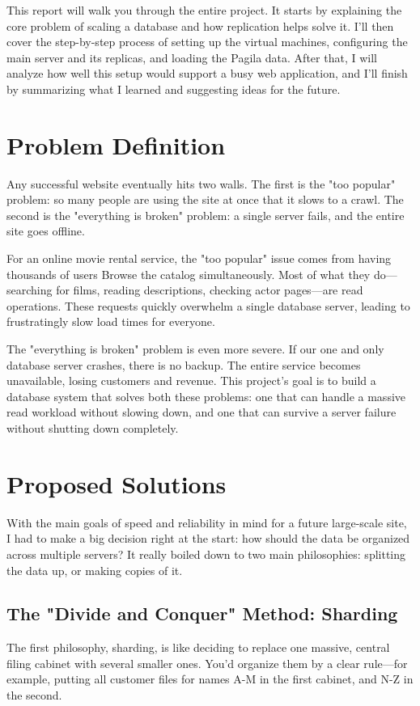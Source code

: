 \documentclass[conference]{IEEEtran}
\begin{document}
This report will walk you through the entire project. It starts by explaining the core problem of scaling a database and how replication helps solve it. I'll then cover the step-by-step process of setting up the virtual machines, configuring the main server and its replicas, and loading the Pagila data. After that, I will analyze how well this setup would support a busy web application, and I'll finish by summarizing what I learned and suggesting ideas for the future.
\section{Problem Definition}
Any successful website eventually hits two walls. The first is the "too popular" problem: so many people are using the site at once that it slows to a crawl. The second is the "everything is broken" problem: a single server fails, and the entire site goes offline.

For an online movie rental service, the "too popular" issue comes from having thousands of users Browse the catalog simultaneously. Most of what they do—searching for films, reading descriptions, checking actor pages—are read operations. These requests quickly overwhelm a single database server, leading to frustratingly slow load times for everyone.

The "everything is broken" problem is even more severe. If our one and only database server crashes, there is no backup. The entire service becomes unavailable, losing customers and revenue. This project's goal is to build a database system that solves both these problems: one that can handle a massive read workload without slowing down, and one that can survive a server failure without shutting down completely.

\section{Proposed Solutions}

With the main goals of speed and reliability in mind for a future large-scale site, I had to make a big decision right at the start: how should the data be organized across multiple servers? It really boiled down to two main philosophies: splitting the data up, or making copies of it.


\subsection{The "Divide and Conquer" Method: Sharding}
The first philosophy, sharding, is like deciding to replace one massive, central filing cabinet with several smaller ones. You'd organize them by a clear rule—for example, putting all customer files for names A-M in the first cabinet, and N-Z in the second.
\end{document}
